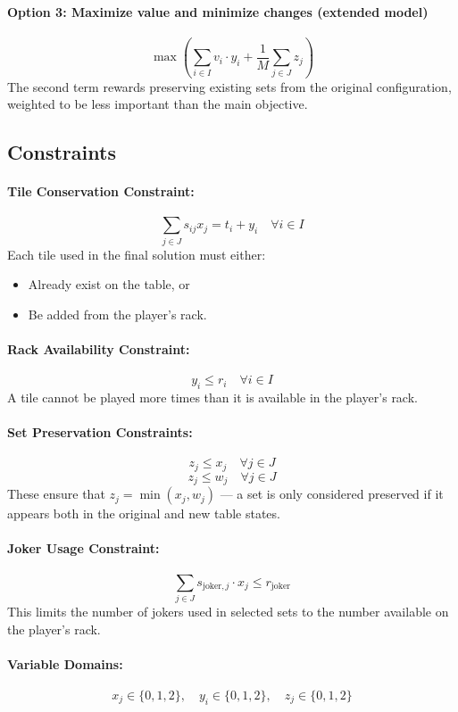 \documentclass[12pt]{article}
\begin{document}
\paragraph{Option 3: Maximize value and minimize changes (extended model)}
\[
\max \left( \sum_{i \in I} v_i \cdot y_i + \frac{1}{M} \sum_{j \in J} z_j \right)
\]
The second term rewards preserving existing sets from the original configuration, weighted to be less important than the main objective.

\subsection{Constraints}

\paragraph{Tile Conservation Constraint:}
\[
\sum_{j \in J} s_{ij} x_j = t_i + y_i \quad \forall i \in I
\]
Each tile used in the final solution must either:
\begin{itemize}
    \item Already exist on the table, or
    \item Be added from the player’s rack.
\end{itemize}

\paragraph{Rack Availability Constraint:}
\[
y_i \leq r_i \quad \forall i \in I
\]
A tile cannot be played more times than it is available in the player’s rack.

\paragraph{Set Preservation Constraints:}
\[
z_j \leq x_j \quad \forall j \in J
\]
\[
z_j \leq w_j \quad \forall j \in J
\]
These ensure that $z_j = \min(x_j, w_j)$ — a set is only considered preserved if it appears both in the original and new table states.

\paragraph{Joker Usage Constraint:}
\[
\sum_{j \in J} s_{\text{joker}, j} \cdot x_j \leq r_{\text{joker}}
\]
This limits the number of jokers used in selected sets to the number available on the player’s rack.

\paragraph{Variable Domains:}
\[
x_j \in \{0, 1, 2\}, \quad y_i \in \{0, 1, 2\}, \quad z_j \in \{0, 1, 2\}
\]
\end{document}
